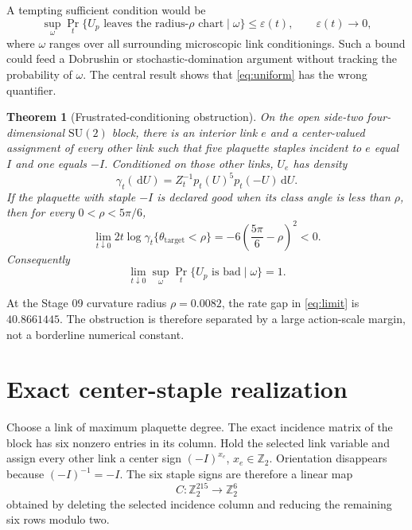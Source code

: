 \documentclass[11pt]{article}
\newtheorem{theorem}{Theorem}[section]
\theoremstyle{definition}
\newcommand{\SU}{\mathrm{SU}(2)}
\newcommand{\Ztwo}{\mathbb Z_2}
\newcommand{\dd}{\,\mathrm{d}}
\begin{document}
A tempting sufficient condition would be
\begin{equation}\label{eq:uniform}
 \sup_{\omega}
 \Pr_t\{U_p\text{ leaves the radius-}\rho\text{ chart}\mid\omega\}
 \le\varepsilon(t),\qquad \varepsilon(t)\longrightarrow0,
\end{equation}
where $\omega$ ranges over all surrounding microscopic link conditionings.
Such a bound could feed a Dobrushin or stochastic-domination argument without
tracking the probability of $\omega$.  The central result shows that
\eqref{eq:uniform} has the wrong quantifier.

\begin{theorem}[Frustrated-conditioning obstruction]\label{thm:main}
On the open side-two four-dimensional $\SU$ block, there is an interior link
$e$ and a center-valued assignment of every other link such that five
plaquette staples incident to $e$ equal $I$ and one equals $-I$.  Conditioned
on those other links, $U_e$ has density
\begin{equation}\label{eq:density}
 \gamma_t(\dd U)=Z_t^{-1}p_t(U)^5p_t(-U)\dd U.
\end{equation}
If the plaquette with staple $-I$ is declared good when its class angle is
less than $\rho$, then for every $0<\rho<5\pi/6$,
\begin{equation}\label{eq:limit}
 \lim_{t\downarrow0}2t\log
 \gamma_t\{\theta_{\mathrm{target}}<\rho\}
 =-6\left(\frac{5\pi}{6}-\rho\right)^2<0.
\end{equation}
Consequently
\[
 \lim_{t\downarrow0}
 \sup_{\omega}\Pr_t\{U_p\text{ is bad}\mid\omega\}=1.
\]
\end{theorem}

At the Stage 09 curvature radius $\rho=0.0082$, the rate gap in
\eqref{eq:limit} is $40.8661445$.  The obstruction is therefore separated by
a large action-scale margin, not a borderline numerical constant.

\section{Exact center-staple realization}\label{sec:center}

Choose a link of maximum plaquette degree.  The exact incidence matrix of the
block has six nonzero entries in its column.  Hold the selected link variable
and assign every other link a center sign $(-I)^{x_e}$,
$x_e\in\Ztwo$.  Orientation disappears because $(-I)^{-1}=-I$.  The six
staple signs are therefore a linear map
\[
 C:\Ztwo^{215}\longrightarrow\Ztwo^6
\]
obtained by deleting the selected incidence column and reducing the remaining
six rows modulo two.
\end{document}
